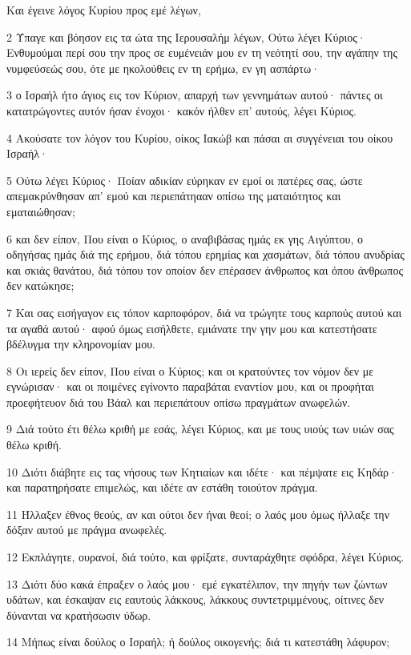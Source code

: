 \par Και έγεινε λόγος Κυρίου προς εμέ λέγων,
\par 2 Ύπαγε και βόησον εις τα ώτα της Ιερουσαλήμ λέγων, Ούτω λέγει Κύριος· Ενθυμούμαι περί σου την προς σε ευμένειάν μου εν τη νεότητί σου, την αγάπην της νυμφεύσεώς σου, ότε με ηκολούθεις εν τη ερήμω, εν γη ασπάρτω·
\par 3 ο Ισραήλ ήτο άγιος εις τον Κύριον, απαρχή των γεννημάτων αυτού· πάντες οι κατατρώγοντες αυτόν ήσαν ένοχοι· κακόν ήλθεν επ' αυτούς, λέγει Κύριος.
\par 4 Ακούσατε τον λόγον του Κυρίου, οίκος Ιακώβ και πάσαι αι συγγένειαι του οίκου Ισραήλ·
\par 5 Ούτω λέγει Κύριος· Ποίαν αδικίαν εύρηκαν εν εμοί οι πατέρες σας, ώστε απεμακρύνθησαν απ' εμού και περιεπάτηααν οπίσω της ματαιότητος και εματαιώθησαν;
\par 6 και δεν είπον, Που είναι ο Κύριος, ο αναβιβάσας ημάς εκ γης Αιγύπτου, ο οδηγήσας ημάς διά της ερήμου, διά τόπου ερημίας και χασμάτων, διά τόπου ανυδρίας και σκιάς θανάτου, διά τόπου τον οποίον δεν επέρασεν άνθρωπος και όπου άνθρωπος δεν κατώκησε;
\par 7 Και σας εισήγαγον εις τόπον καρποφόρον, διά να τρώγητε τους καρπούς αυτού και τα αγαθά αυτού· αφού όμως εισήλθετε, εμιάνατε την γην μου και κατεστήσατε βδέλυγμα την κληρονομίαν μου.
\par 8 Οι ιερείς δεν είπον, Που είναι ο Κύριος; και οι κρατούντες τον νόμον δεν με εγνώρισαν· και οι ποιμένες εγίνοντο παραβάται εναντίον μου, και οι προφήται προεφήτευον διά του Βάαλ και περιεπάτουν οπίσω πραγμάτων ανωφελών.
\par 9 Διά τούτο έτι θέλω κριθή με εσάς, λέγει Κύριος, και με τους υιούς των υιών σας θέλω κριθή.
\par 10 Διότι διάβητε εις τας νήσους των Κητιαίων και ιδέτε· και πέμψατε εις Κηδάρ· και παρατηρήσατε επιμελώς, και ιδέτε αν εστάθη τοιούτον πράγμα.
\par 11 Ήλλαξεν έθνος θεούς, αν και ούτοι δεν ήναι θεοί; ο λαός μου όμως ήλλαξε την δόξαν αυτού με πράγμα ανωφελές.
\par 12 Εκπλάγητε, ουρανοί, διά τούτο, και φρίξατε, συνταράχθητε σφόδρα, λέγει Κύριος.
\par 13 Διότι δύο κακά έπραξεν ο λαός μου· εμέ εγκατέλιπον, την πηγήν των ζώντων υδάτων, και έσκαψαν εις εαυτούς λάκκους, λάκκους συντετριμμένους, οίτινες δεν δύνανται να κρατήσωσιν ύδωρ.
\par 14 Μήπως είναι δούλος ο Ισραήλ; ή δούλος οικογενής; διά τι κατεστάθη λάφυρον;
